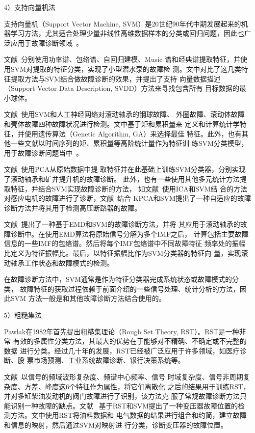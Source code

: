 4）支持向量机法

支持向量机（Support Vector Machine, SVM）是20世纪90年代中期发展起来的机
器学习方法，尤其适合处理少量非线性高维数据样本的分类或回归问题，因此也广
泛应用于故障诊断领域~\cite{huqiao2006improved}。

文献~分别使用功率谱、包络谱、自回归建模、Music
谱和经典谱提取特征，并使用SVM对提取的特征分类，实现了小型潜水泵的故障检
测。文中对比了这几类特征提取方法与SVM结合做故障诊断的效果，并提出了支持
向量数据描述（Support Vector Data Description, SVDD）方法来寻找包含所有
目标数据的最小球体。

文献~使用SVM和人工神经网络对滚动轴承的钢球故障、
外圈故障、滚动体故障和壳体故障四种故障状况进行检测。文中基于矩和累积量来
定义和计算统计学特征，并使用遗传算法（Genetic Algorithm, GA）来选择最佳
特征。此外，也有其他一些文献以时间序列的矩、累积量等高阶统计量作为特征训
练SVM分类模型，用于故障诊断问题当中~\cite{ren2005application, sugumaran2007feature, hu2007fault, yang2005cavitation}。

文献~使用PCA从原始数据中提
取特征并在此基础上训练SVM分类器，分别实现了滚动轴承和矿井提升机的故障诊断。
此外，也有一些使用其他多元统计方法提取特征，并结合SVM实现故障诊断的方法，
如文献~使用ICA和SVM结
合的方法对感应电机的故障进行了诊断，文献~结合
KPCA和SVM提出了一种自适应的故障诊断方法并将其用于检测高压断路器的故障。

文献~提出了一种基于EMD和SVM的故障诊断方法，并将
其应用于滚动轴承的故障诊断中。在使用EMD算法将原始信号分解为多个IMF之后，
计算包括主要故障信息的一些IMF的包络谱。然后将每个IMF包络谱中不同故障特征
频率处的振幅比定义为特征振幅比。最后，以特征振幅比作为SVM分类器的特征向
量，实现滚动轴承工作状态和故障模式的检测。

在故障诊断方法中，SVM通常是作为特征分类器完成系统状态或故障模式的分类，
故障特征的获取过程依赖于前面介绍的一些信号处理、统计分析的方法，因此SVM
方法一般是和其他故障诊断方法结合使用的。

5）粗糙集法

Pawlak在1982年首先提出粗糙集理论（Rough Set Theory, RST）。RST是一种非常
有效的多属性分类方法，其最大的优势在于能够对不精确、不确定或不完整的数据
进行分类。经过几十年的发展，RST已经被广泛应用于许多领域，如医疗诊断、股
票市场预测、工业系统故障诊断、银行决策系统等。

文献~以信号的频域波形复杂度、频谱中心频率、信号
时域复杂度、信号非周期复杂度、方差、峰度这6个特征作为属性，将它们离散化
之后的结果用于训练RST，并对多缸柴油发动机的阀门故障进行了识别，该方法克
服了常规故障诊断方法只能识别一种故障的缺点。文献~
基于RST和SVM提出了一种变压器故障位置的检测方法。文中使用RST将油料数据和
电气数据的结果进行组合和约简，建立故障和信息的映射，然后通过SVM对映射进
行分类，诊断变压器的故障位置。

